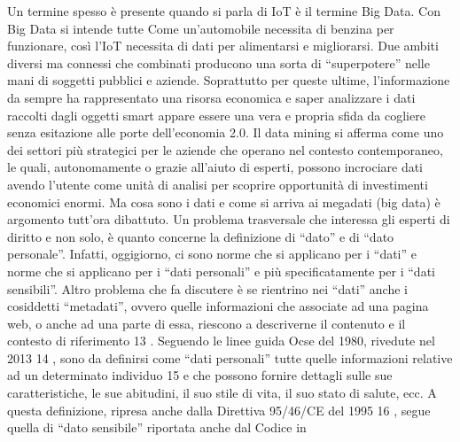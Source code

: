 Un termine spesso è presente quando si parla di IoT è il
termine Big Data. Con Big Data si intende tutte 
Come un’automobile necessita di benzina per funzionare, così l’IoT necessita di
dati per alimentarsi e migliorarsi. Due ambiti diversi ma connessi che combinati
producono una sorta di “superpotere” nelle mani di soggetti pubblici e aziende.
Soprattutto per queste ultime, l’informazione da sempre ha rappresentato una
risorsa economica e saper analizzare i dati raccolti dagli oggetti smart appare
essere una vera e propria sfida da cogliere senza esitazione alle porte dell’economia
2.0. Il data mining si afferma come uno dei settori più strategici per le aziende che
operano nel contesto contemporaneo, le quali, autonomamente o grazie all’aiuto di
esperti, possono incrociare dati avendo l’utente come unità di analisi per scoprire
opportunità di investimenti economici enormi. Ma cosa sono i dati e come si arriva
ai megadati (big data) è argomento tutt’ora dibattuto.
Un problema trasversale che interessa gli esperti di diritto e non solo, è quanto
concerne la definizione di “dato” e di “dato personale”. Infatti, oggigiorno, ci sono
norme che si applicano per i “dati” e norme che si applicano per i “dati personali”
e più specificatamente per i “dati sensibili”. Altro problema che fa discutere è se
rientrino nei “dati” anche i cosiddetti “metadati”, ovvero quelle informazioni che
associate ad una pagina web, o anche ad una parte di essa, riescono a descriverne
il contenuto e il contesto di riferimento 13 .
Seguendo le linee guida Ocse del 1980, rivedute nel 2013 14 , sono da definirsi come
“dati personali” tutte quelle informazioni relative ad un determinato individuo 15 e
che possono fornire dettagli sulle sue caratteristiche, le sue abitudini, il suo stile
di vita, il suo stato di salute, ecc. A questa definizione, ripresa anche dalla Direttiva
95/46/CE del 1995 16 , segue quella di “dato sensibile” riportata anche dal Codice in
